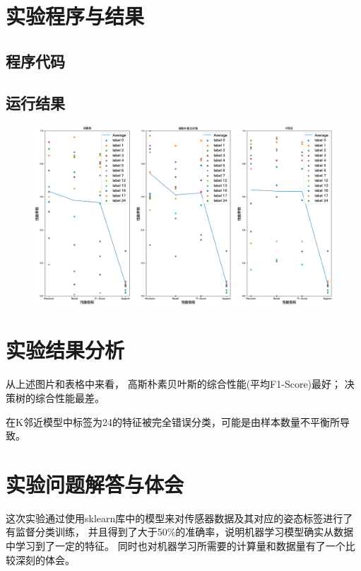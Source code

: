 \documentclass[a4paper]{ctexart}
\begin{document}
  \section{实验程序与结果}
  \subsection{程序代码}
  
  \subsection{运行结果}
  \begin{figure}[H]
    \includegraphics*[width=1.0\textwidth]{fig/output.png}
  \end{figure}

  

  \section{实验结果分析}
  从上述图片和表格中来看，
  高斯朴素贝叶斯的综合性能(平均F1-Score)最好；
  决策树的综合性能最差。

  在K邻近模型中标签为24的特征被完全错误分类，可能是由样本数量不平衡所导致。
  \section{实验问题解答与体会}

  这次实验通过使用sklearn库中的模型来对传感器数据及其对应的姿态标签进行了有监督分类训练，
  并且得到了大于50\%的准确率，说明机器学习模型确实从数据中学习到了一定的特征。
  同时也对机器学习所需要的计算量和数据量有了一个比较深刻的体会。
\end{document}

